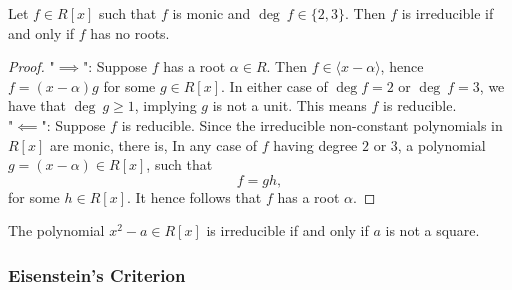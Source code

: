 \begin{proposition}\label{MonicPolynomialOverUFDIrreducibleCriterion}
    Let $f\in R[x]$ such that $f$ is monic and $\deg\ f \in\{2,3\}$. Then $f$ is irreducible if and only if $f$ has no roots. 
\end{proposition}
\begin{proof}
    "$\implies$": Suppose $f$ has a root $\alpha\in R$. Then $f\in \langle x-\alpha\rangle $, hence $f = (x-\alpha)g$ for some $g \in R[x]$. In either case of $\deg f = 2$ or $\deg \ f =3$, we have that $\deg \ g \geq 1$, implying $g$ is not a unit. This means $f$ is reducible.\\
    "$\impliedby$": Suppose $f$ is reducible. Since the irreducible non-constant polynomials in $R[x]$ are monic, there is, In any case of $f$ having degree $2$ or $3$, a polynomial $g = (x-\alpha)\in R[x]$, such that 
    $$f = gh,$$
    for some $h\in R[x]$. It hence follows that $f$ has a root $\alpha$.
\end{proof}
\begin{corollary}
    The polynomial $x^2-a\in R[x]$ is irreducible if and only if $a$ is not a square. 
\end{corollary}
\subsubsection{Eisenstein's Criterion}
